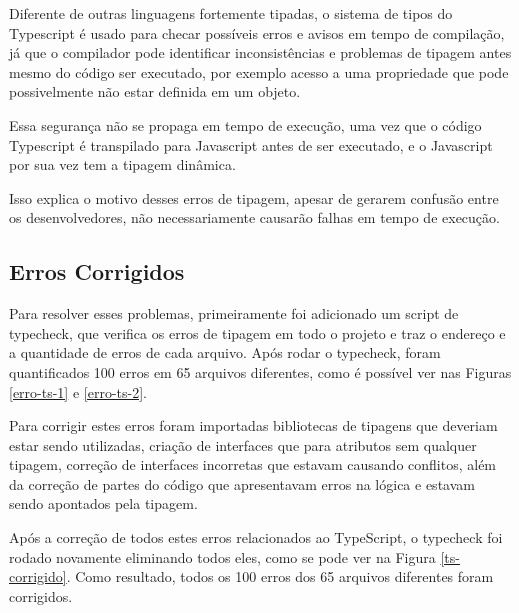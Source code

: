 Diferente de outras linguagens fortemente tipadas, o sistema de tipos do Typescript é usado para checar possíveis erros e avisos em tempo de compilação, já que o compilador pode identificar inconsistências e problemas de tipagem antes mesmo do código ser executado, por exemplo acesso a uma propriedade que pode possivelmente não estar definida em um objeto. 

Essa segurança não se propaga em tempo de execução, uma vez que o código Typescript é transpilado para Javascript antes de ser executado, e o Javascript por sua vez tem a tipagem dinâmica. 

Isso explica o motivo desses erros de tipagem, apesar de gerarem confusão entre os desenvolvedores, não necessariamente causarão falhas em tempo de execução.

\subsection{Erros Corrigidos}
Para resolver esses problemas, primeiramente foi adicionado um script de typecheck, que verifica os erros de tipagem em todo o projeto e traz o endereço e a quantidade de erros de cada arquivo. Após rodar o typecheck, foram quantificados 100 erros em 65 arquivos diferentes, como é possível ver nas Figuras \ref{erro-ts-1} e \ref{erro-ts-2}.

Para corrigir estes erros foram importadas bibliotecas de tipagens que deveriam estar sendo utilizadas, criação de interfaces que para atributos sem qualquer tipagem, correção de interfaces incorretas que estavam causando conflitos, além da correção de partes do código que apresentavam erros na lógica e estavam sendo apontados pela tipagem.

Após a correção de todos estes erros relacionados ao TypeScript, o typecheck foi rodado novamente eliminando todos eles, como se pode ver na Figura \ref{ts-corrigido}. Como resultado, todos os 100 erros dos 65 arquivos diferentes foram corrigidos.

